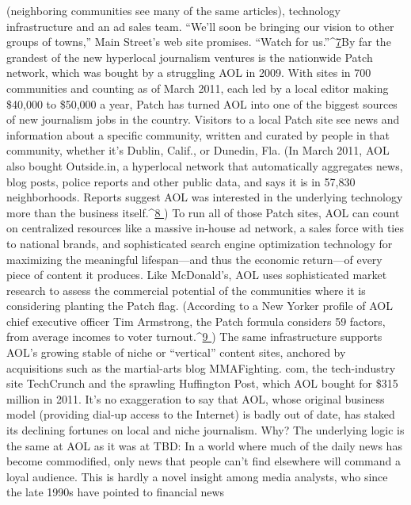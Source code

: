 (neighboring communities see many of the same articles), technology infrastructure
and an ad sales team. ``We’ll soon be bringing our vision to other groups of
towns,'' Main Street’s web site promises. ``Watch for us.''^{\href{#endnotes-ch3}{7}}By far the grandest of the new hyperlocal journalism ventures is the nationwide
Patch network, which was bought by a struggling AOL in 2009. With sites
in 700 communities and counting as of March 2011, each led by a local editor
making \$40,000 to \$50,000 a year, Patch has turned AOL into one of the biggest
sources of new journalism jobs in the country. Visitors to a local Patch site
see news and information about a specific community, written and curated by
people in that community, whether it’s Dublin, Calif., or Dunedin, Fla. (In March
2011, AOL also bought Outside.in, a hyperlocal network that automatically aggregates
news, blog posts, police reports and other public data, and says it is in
57,830 neighborhoods. Reports suggest AOL was interested in the underlying
technology more than the business itself.^{\href{#endnotes-ch3}{8 }})
To run all of those Patch sites, AOL can count on centralized resources like
a massive in-house ad network, a sales force with ties to national brands, and
sophisticated search engine optimization technology for maximizing the meaningful
lifespan—and thus the economic return—of every piece of content it
produces. Like McDonald’s, AOL uses sophisticated market research to assess the
commercial potential of the communities where it is considering planting the
Patch flag. (According to a New Yorker profile of AOL chief executive officer
Tim Armstrong, the Patch formula considers 59 factors, from average incomes
to voter turnout.^{\href{#endnotes-ch3}{9 }})
The same infrastructure supports AOL’s growing stable of niche or ``vertical''
content sites, anchored by acquisitions such as the martial-arts blog MMAFighting.
com, the tech-industry site TechCrunch and the sprawling Huffington Post,
which AOL bought for \$315 million in 2011. It’s no exaggeration to say that
AOL, whose original business model (providing dial-up access to the Internet) is
badly out of date, has staked its declining fortunes on local and niche journalism.
Why? The underlying logic is the same at AOL as it was at TBD: In a world
where much of the daily news has become commodified, only news that people
can’t find elsewhere will command a loyal audience. This is hardly a novel insight
among media analysts, who since the late 1990s have pointed to financial news
